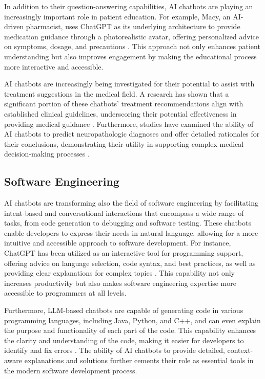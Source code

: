 In addition to their question-answering capabilities, AI chatbots are playing an increasingly important role in patient education. For example, Macy, an AI-driven pharmacist, uses ChatGPT as its underlying architecture to provide medication guidance through a photorealistic avatar, offering personalized advice on symptoms, dosage, and precautions \cite{leung2023}. This approach not only enhances patient understanding but also improves engagement by making the educational process more interactive and accessible.

AI chatbots are increasingly being investigated for their potential to assist with treatment suggestions in the medical field. A research has shown that a significant portion of these chatbots' treatment recommendations align with established clinical guidelines, underscoring their potential effectiveness in providing medical guidance \cite{chen2023use}. Furthermore, studies have examined the ability of AI chatbots to predict neuropathologic diagnoses and offer detailed rationales for their conclusions, demonstrating their utility in supporting complex medical decision-making processes \cite{koga2024evaluating}.

\subsection{Software Engineering}

AI chatbots are transforming also the field of software engineering by facilitating intent-based and conversational interactions that encompass a wide range of tasks, from code generation to debugging and software testing. These chatbots enable developers to express their needs in natural language, allowing for a more intuitive and accessible approach to software development. For instance, ChatGPT has been utilized as an interactive tool for programming support, offering advice on language selection, code syntax, and best practices, as well as providing clear explanations for complex topics \cite{meyer2023chatgpt}. This capability not only increases productivity but also makes software engineering expertise more accessible to programmers at all levels.

Furthermore, LLM-based chatbots are capable of generating code in various programming languages, including Java, Python, and C++, and can even explain the purpose and functionality of each part of the code. This capability enhances the clarity and understanding of the code, making it easier for developers to identify and fix errors \cite{dam2024complete}. The ability of AI chatbots to provide detailed, context-aware explanations and solutions further cements their role as essential tools in the modern software development process.

